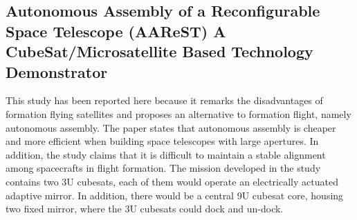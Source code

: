\subsection{Autonomous Assembly of a Reconfigurable Space Telescope (AAReST) \textendash{} A CubeSat/Microsatellite Based Technology Demonstrator}
\label{aarest}
This study has been reported here because it remarks the disadvantages
of formation flying satellites and proposes an alternative to formation
flight, namely autonomous assembly. The paper states that autonomous assembly
is cheaper and more efficient when building space telescopes with
large apertures. In addition, the study claims that it is difficult
to maintain a stable alignment among spacecrafts in flight formation.
The mission developed in the study contains two 3U cubesats, each
of them would operate an electrically actuated adaptive mirror. In
addition, there would be a central 9U cubesat core, housing two fixed
mirror, where the 3U cubesats could dock and un-dock.\cite{Underwood_ReconfigTelescope}